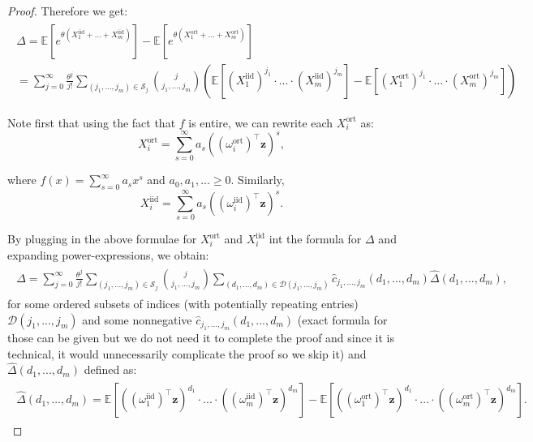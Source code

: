 \begin{proof}
Therefore we get:
\begin{align}
\begin{split}
\Delta = \mathbb{E}[e^{\theta (X_{1}^{\mathrm{iid}}+...+X_{m}^{\mathrm{iid}})}] - \mathbb{E}[e^{\theta (X_{1}^{\mathrm{ort}}+...+X_{m}^{\mathrm{ort}})}] \\
=
\sum_{j=0}^{\infty} \frac{\theta^{j}}{j!} \sum_{(j_{1},...,j_{m}) \in \mathcal{S}_{j}} \binom{j}{j_{1},\dots,j_{m}} \left(\mathbb{E}[(X_{1}^{\mathrm{iid}})^{j_{1}} \cdot ... \cdot (X_{m}^{\mathrm{iid}})^{j_{m}}] - \mathbb{E}[(X_{1}^{\mathrm{ort}})^{j_{1}} \cdot ... \cdot (X_{m}^{\mathrm{ort}})^{j_{m}}]\right)
\end{split}
\end{align}



Note first that using the fact that $f$ is entire, we can rewrite each $X_{i}^{\mathrm{ort}}$ as:
\begin{equation}
\label{x_ort_formula}
X_{i}^{\mathrm{ort}} = \sum_{s=0}^{\infty} a_{s}((\omega_{i}^{\mathrm{ort}})^{\top}\mathbf{z})^{s},
\end{equation}

where $f(x) = \sum_{s=0}^{\infty} a_{s}x^{s}$
and $a_{0},a_{1},... \geq 0$.
Similarly,
\begin{equation}
\label{x_iid_formula}
X_{i}^{\mathrm{iid}} = \sum_{s=0}^{\infty} a_{s}((\omega_{i}^{\mathrm{iid}})^{\top}\mathbf{z})^{s}.
\end{equation}

By plugging in the above formulae for $X_{i}^{\mathrm{ort}}$ and $X_{i}^{\mathrm{iid}}$ int the formula for $\Delta$ and expanding power-expressions, we obtain:
\begin{align}
\begin{split}
\Delta = \sum_{j=0}^{\infty} \frac{\theta^{j}}{j!} \sum_{(j_{1},...,j_{m}) \in \mathcal{S}_{j}} \binom{j}{j_{1},\dots,j_{m}} \sum_{(d_{1},...,d_{m}) \in \mathcal{D}(j_{1},...,j_{m})} \widehat{c}_{j_1, \dots, j_m}(d_{1},\dots,d_{m}) \widehat{\Delta}(d_{1},...,d_{m}),
\end{split}    
\end{align}
for some ordered subsets of indices (with potentially repeating entries) $\mathcal{D}(j_{1},...,j_{m})$ and some nonnegative $\widehat{c}_{j_1, \dots, j_m}(d_{1},\dots,d_{m})$ (exact formula for those can be given but we do not need it to complete the proof and since it is technical, it would unnecessarily complicate the proof so we skip it)
and $\widehat{\Delta}(d_{1},...,d_{m})$ defined as:
\begin{align}
\begin{split}
\label{imp-ineq}
\widehat{\Delta}(d_{1},...,d_{m}) = \mathbb{E}[((\omega_{1}^{\mathrm{iid}})^{\top}\mathbf{z})^{d_{1}} \cdot ... \cdot ((\omega_{m}^{\mathrm{iid}})^{\top}\mathbf{z})^{d_{m}}] - 
\mathbb{E}[((\omega_{1}^{\mathrm{ort}})^{\top}\mathbf{z})^{d_{1}} \cdot ... \cdot ((\omega_{m}^{\mathrm{ort}})^{\top}\mathbf{z})^{d_{m}}].
\end{split}
\end{align}


\end{proof}

